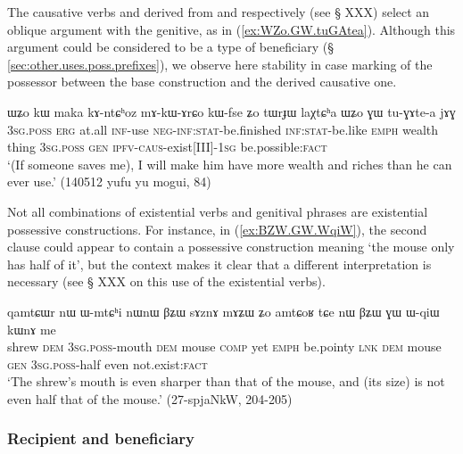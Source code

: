 The causative verbs  and  derived from  and  respectively (see § XXX) select an oblique argument with the genitive, as in (\ref{ex:WZo.GW.tuGAtea}). Although this argument could be considered to be a type of beneficiary (§ \ref{sec:other.uses.poss.prefixes}), we observe here stability in case marking of the possessor between the base construction and the derived causative one.

\begin{exe} 
\ex \label{ex:WZo.GW.tuGAtea} 
\gll ɯʑo kɯ maka kɤ-ntɕʰoz mɤ-kɯ-ɤrɕo kɯ-fse ʑo tɯrɟɯ laχtɕʰa ɯʑo ɣɯ tu-ɣɤte-a jɤɣ \\ 
\textsc{3sg}.\textsc{poss} \textsc{erg} at.all \textsc{inf}-use \textsc{neg}-\textsc{inf}:\textsc{stat}-be.finished \textsc{inf}:\textsc{stat}-be.like \textsc{emph} wealth thing \textsc{3sg}.\textsc{poss} \textsc{gen} \textsc{ipfv}-\textsc{caus}-exist[III]-\textsc{1sg} be.possible:\textsc{fact} \\ 
\glt `(If someone saves me), I will make him have more wealth and riches than he can ever use.' (140512 yufu yu mogui, 84) 
\end{exe} 

Not all combinations of existential verbs and genitival phrases are existential possessive constructions. For instance, in (\ref{ex:BZW.GW.WqiW}), the second clause could appear to contain a possessive construction meaning `the mouse only has half of it', but the context makes it clear that a different interpretation is necessary (see § XXX on this use of the existential verbs).

\begin{exe}
\ex \label{ex:BZW.GW.WqiW}
\gll qamtɕɯr nɯ ɯ-mtɕʰi nɯnɯ βʑɯ sɤznɤ mɤʑɯ ʑo amtɕoʁ tɕe nɯ βʑɯ ɣɯ ɯ-qiɯ kɯnɤ me \\
shrew \textsc{dem} \textsc{3sg}.\textsc{poss}-mouth \textsc{dem} mouse \textsc{comp} yet \textsc{emph} be.pointy \textsc{lnk} \textsc{dem} mouse \textsc{gen} \textsc{3sg}.\textsc{poss}-half even not.exist:\textsc{fact} \\
\glt `The shrew's mouth is even sharper than that of the mouse, and (its size) is not even half that of the mouse.' (27-spjaNkW, 204-205)
\end{exe}



 
\subsubsection{Recipient and beneficiary} \label{sec:gen.beneficiary}
 
